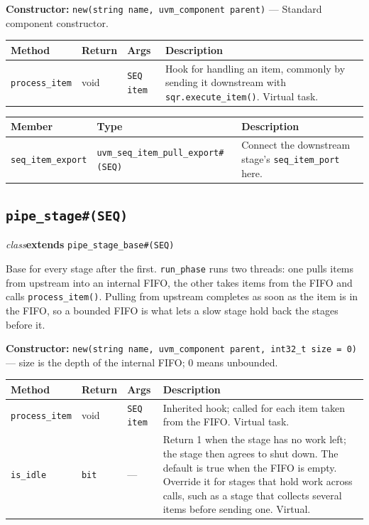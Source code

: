 \documentclass[11pt,letterpaper]{report}
\begin{document}
\noindent\textbf{Constructor:} \texttt{new(string name, uvm\_component parent)} --- Standard component constructor.

\begin{xltabular}{\linewidth}{>{\small}p{1.35in} >{\small}p{1.25in} >{\small}p{0.95in} >{\small}X}
\toprule
\textbf{Method} & \textbf{Return} & \textbf{Args} & \textbf{Description} \\
\midrule
\endhead
\bottomrule
\endfoot
\texttt{process\_item} & void & \texttt{SEQ item} & Hook for handling an item, commonly by sending it downstream with \texttt{sqr.execute\_item()}. Virtual task. \\
\end{xltabular}

\begin{xltabular}{\linewidth}{>{\small}p{1.5in} >{\small}p{1.5in} >{\small}X}
\toprule
\textbf{Member} & \textbf{Type} & \textbf{Description} \\
\midrule
\endhead
\bottomrule
\endfoot
\texttt{seq\_item\_export} & \texttt{uvm\_seq\_item\_pull\_export\#(SEQ)} & Connect the downstream stage's \texttt{seq\_item\_port} here. \\
\end{xltabular}

\subsection*{\texttt{pipe\_stage\#(SEQ)}}
\noindent\small\textit{class}\quad \textbf{extends} \texttt{pipe\_stage\_base\#(SEQ)}\par

Base for every stage after the first. \texttt{run\_phase} runs two threads: one pulls items from upstream into an internal FIFO, the other takes items from the FIFO and calls \texttt{process\_item()}. Pulling from upstream completes as soon as the item is in the FIFO, so a bounded FIFO is what lets a slow stage hold back the stages before it.

\noindent\textbf{Constructor:} \texttt{new(string name, uvm\_component parent, int32\_t size = 0)} --- size is the depth of the internal FIFO; 0 means unbounded.

\begin{xltabular}{\linewidth}{>{\small}p{1.35in} >{\small}p{1.25in} >{\small}p{0.95in} >{\small}X}
\toprule
\textbf{Method} & \textbf{Return} & \textbf{Args} & \textbf{Description} \\
\midrule
\endhead
\bottomrule
\endfoot
\texttt{process\_item} & void & \texttt{SEQ item} & Inherited hook; called for each item taken from the FIFO. Virtual task. \\
\texttt{is\_idle} & \texttt{bit} & --- & Return 1 when the stage has no work left; the stage then agrees to shut down. The default is true when the FIFO is empty. Override it for stages that hold work across calls, such as a stage that collects several items before sending one. Virtual. \\
\end{xltabular}
\end{document}

